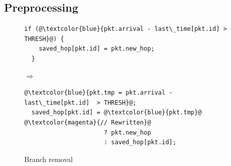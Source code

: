 \subsection{Preprocessing}
\label{ss:preprocessing}

\begin{figure}[!t]
  \hspace{-0.4in}
  \begin{minipage}{0.55\textwidth}
  \begin{small}
  \begin{lstlisting}[style=customcscriptsize, numbers=none, frame=none]
  if (@\textcolor{blue}{pkt.arrival - last\_time[pkt.id] > THRESH}@) {
    saved_hop[pkt.id] = pkt.new_hop;
  }
  \end{lstlisting}
  \end{small}
  \end{minipage}
%  
  \hspace{-0.3in}
  $\Longrightarrow$ 
  \hspace{-0.3in}
%  
  \begin{minipage}{0.6\textwidth}
  \begin{small}
  \begin{lstlisting}[style=customcscriptsize, numbers=none, frame=none]
  @\textcolor{blue}{pkt.tmp = pkt.arrival - last\_time[pkt.id]  > THRESH}@;
  saved_hop[pkt.id] = @\textcolor{blue}{pkt.tmp}@  @\textcolor{magenta}{// Rewritten}@
                      ? pkt.new_hop
                      : saved_hop[pkt.id];
  \end{lstlisting}
  \end{small}
  \end{minipage}
\caption{Branch removal}
\label{fig:if_convert}
\end{figure}

